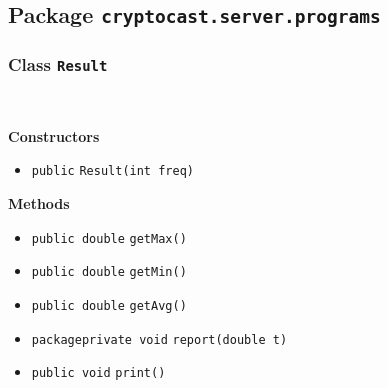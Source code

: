 \subsection{Package \lstinline!cryptocast.server.programs!}


\subsubsection{Class \lstinline|Result|}
 \\
\noindent\begin{minipage}[t]{5cm}
\vspace{0.3em}
\hspace*{2em}
\vspace{0.3em}
\end{minipage}




\textbf{\sffamily Constructors}
\begin{itemize}
\item \lstinline|public| \lstinline|Result|\lstinline|(int freq)| \\[-0.6em]




\end{itemize}


\textbf{\sffamily Methods}
\begin{itemize}
\item \lstinline|public double| \lstinline|getMax|\lstinline|()| \\[-0.6em]




\item \lstinline|public double| \lstinline|getMin|\lstinline|()| \\[-0.6em]




\item \lstinline|public double| \lstinline|getAvg|\lstinline|()| \\[-0.6em]




\item \lstinline|packageprivate void| \lstinline|report|\lstinline|(double t)| \\[-0.6em]




\item \lstinline|public void| \lstinline|print|\lstinline|()| \\[-0.6em]




\end{itemize}

